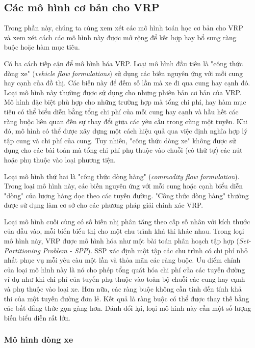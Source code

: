 \subsection{Các mô hình cơ bản cho VRP}
\label{sec:math_common}

Trong phần này, chúng ta cùng xem xét các mô hình toán học cơ bản cho VRP và xem xét cách các mô hình này được mở rộng để kết hợp hay bổ sung ràng buộc hoặc hàm mục tiêu.

Có ba cách tiếp cận để mô hình hóa VRP. Loại mô hình đầu tiên là "công thức dòng xe" (\textit{vehicle flow formulations}) sử dụng các biến nguyên ứng với mỗi cung hay cạnh của đồ thị. Các biến này để đếm số lần mà xe đi qua cung hay cạnh đó. Loại mô hình này thường được sử dụng cho những phiên bản cơ bản của VRP. Mô hình đặc biệt phù hợp cho những trường hợp mà tổng chi phí, hay hàm mục tiêu có thể biểu diễn bằng tổng chi phí của mỗi cung hay cạnh và hầu hết các ràng buộc liên quan đến sự thay đổi giữa các yêu cầu trong cùng một tuyến. Khi đó, mô hình có thể được xây dựng một cách hiệu quả qua việc định nghĩa hợp lý tập cung và chi phí của cung. Tuy nhiên, "công thức dòng xe" không được sử dụng cho các bài toán mà tổng chi phí phụ thuộc vào chuỗi (có thứ tự) các nút hoặc phụ thuộc vào loại phương tiện.

Loại mô hình thứ hai là "công thức dòng hàng" (\textit{commodity flow formulation}). Trong loại mô hình này, các biến nguyên ứng với mỗi cung hoặc cạnh biểu diễn "dòng" của lượng hàng dọc theo các tuyến đường. "Công thức dòng hàng" thường được sử dụng làm cơ sở cho các phương pháp giải chính xác VRP.

Loại mô hình cuối cùng có số biến nhị phân tăng theo cấp số nhân với kích thước của đầu vào, mỗi biến biểu thị cho một chu trình khả thi khác nhau. Trong loại mô hình này, VRP được mô hình hóa như một bài toán phân hoạch tập hợp (\textit{Set-Partitioning Problem - SPP}). SSP xác định một tập các chu trình có chi phí nhỏ nhất phục vụ mỗi yêu càu một lần và thỏa mãn các ràng buộc. Ưu điểm chính của loại mô hình này là nó cho phép tổng quát hóa chi phí của các tuyến đường ví dụ như khi chi phí của tuyến phụ thuộc vào toàn bộ chuỗi các cung hay cạnh và phụ thuộc vào loại xe. Hơn nữa, các ràng buộc không cần tính đến tính khả thi của một tuyến đường đơn lẻ. Kết quả là ràng buộc có thể được thay thế bằng các bất đẳng thức gọn gàng hơn. Đánh đổi lại, loại mô hình này cần một số lượng biến biểu diễn rất lớn.

\subsubsection*{Mô hình dòng xe}


